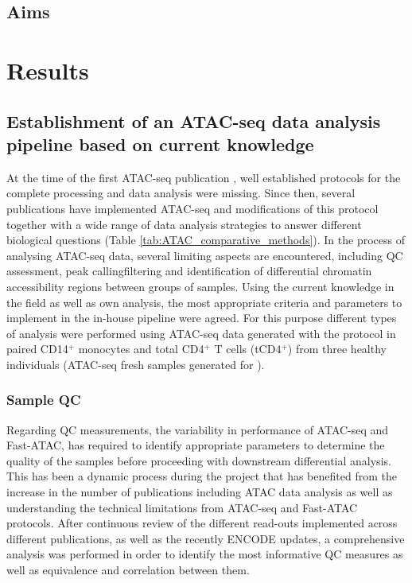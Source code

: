 \subsection{Aims}






\section{Results}
%

\subsection{Establishment of an ATAC-seq data analysis pipeline based on current knowledge}
At the time of the first ATAC-seq publication \parencite{Buenrostro2013}, well established protocols for the complete processing and data analysis were missing. Since then, several publications have implemented ATAC-seq and modifications of this protocol together with a wide range of data analysis strategies to answer different biological questions (Table \ref{tab:ATAC_comparative_methods}).
In the process of analysing ATAC-seq data, several limiting aspects are encountered, including QC assessment, peak calling\/filtering and identification of differential chromatin accessibility regions between groups of samples. Using the current knowledge in the field as well as own analysis, the most appropriate criteria and parameters to implement in the in-house pipeline were agreed. For this purpose different types of analysis were performed using ATAC-seq data generated with the \parencite{Buenrostro2013} protocol in paired CD14$^+$ monocytes and total CD4$^+$ T cells (tCD4$^+$) from three healthy individuals (ATAC-seq fresh samples generated for \label{Core}). 


\subsubsection{Sample QC}
Regarding QC measurements, the variability in performance of ATAC-seq and Fast-ATAC, has required to identify appropriate parameters to determine the quality of the samples before proceeding with downstream differential analysis. This has been a dynamic process during the project that has benefited from the increase in the number of publications including ATAC data analysis as well as understanding the technical limitations from ATAC-seq and Fast-ATAC protocols. After continuous review of the different read-outs implemented across different publications, as well as the recently ENCODE updates, a comprehensive analysis was performed in order to identify the most informative QC measures as well as equivalence and correlation between them.

